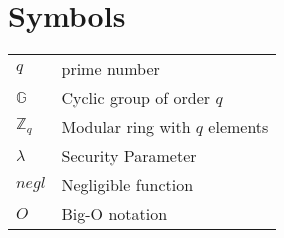 \documentclass[master=mcs]{kulemt}
\begin{document}
\section*{Symbols}
\begin{flushleft}
  \renewcommand{\arraystretch}{1.1}
  \begin{tabularx}{\textwidth}{@{}p{12mm}X@{}}
    $q$ & prime number \\
    $\mathbb{G}$   & Cyclic group of order $q$ \\
    $\mathbb{Z}_q$   & Modular ring with $q$ elements \\
    $\lambda$   & Security Parameter \\
    $negl$ & Negligible function \\
    $O$ & Big-O notation \\
  \end{tabularx}
\end{flushleft}

\mainmatter







\appendixpage*          %
\appendix



\backmatter


\end{document}

